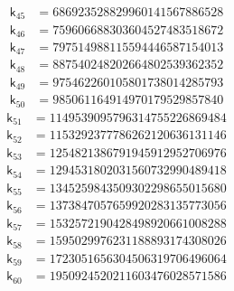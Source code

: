 \[
\begin{aligned}
\mathsf{k}_{45} &={} 686923528829960141567886528
\end{aligned}
\]
\[
\begin{aligned}
\mathsf{k}_{46} &={} 759606688303604527483518672
\end{aligned}
\]
\[
\begin{aligned}
\mathsf{k}_{47} &={} 797514988115594446587154013
\end{aligned}
\]
\[
\begin{aligned}
\mathsf{k}_{48} &={} 887540248202664802539362352
\end{aligned}
\]
\[
\begin{aligned}
\mathsf{k}_{49} &={} 975462260105801738014285793
\end{aligned}
\]
\[
\begin{aligned}
\mathsf{k}_{50} &={} 985061164914970179529857840
\end{aligned}
\]
\[
\begin{aligned}
\mathsf{k}_{51} &={} 1149539095796314755226869484
\end{aligned}
\]
\[
\begin{aligned}
\mathsf{k}_{52} &={} 1153292377786262120636131146
\end{aligned}
\]
\[
\begin{aligned}
\mathsf{k}_{53} &={} 1254821386791945912952706976
\end{aligned}
\]
\[
\begin{aligned}
\mathsf{k}_{54} &={} 1294531802031560732990489418
\end{aligned}
\]
\[
\begin{aligned}
\mathsf{k}_{55} &={} 1345259843509302298655015680
\end{aligned}
\]
\[
\begin{aligned}
\mathsf{k}_{56} &={} 1373847057659920283135773056
\end{aligned}
\]
\[
\begin{aligned}
\mathsf{k}_{57} &={} 1532572190428498920661008288
\end{aligned}
\]
\[
\begin{aligned}
\mathsf{k}_{58} &={} 1595029976231188893174308026
\end{aligned}
\]
\[
\begin{aligned}
\mathsf{k}_{59} &={} 1723051656304506319706496064
\end{aligned}
\]
\[
\begin{aligned}
\mathsf{k}_{60} &={} 1950924520211603476028571586
\end{aligned}
\]
